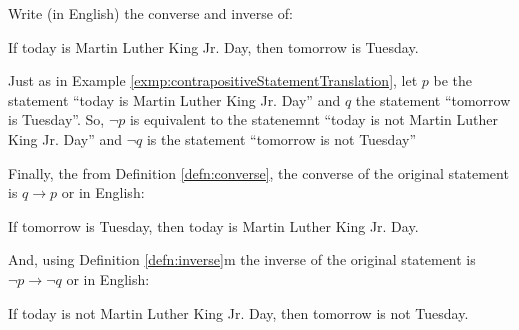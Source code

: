 \guard






\begin{exmp}
\label{exmp:converseInverseStatementTranslation}
  Write (in English) the converse and inverse of:
  \begin{center}
      If today is Martin Luther King Jr. Day, then tomorrow is Tuesday.
  \end{center}

  Just as in Example \ref{exmp:contrapositiveStatementTranslation}, let $p$ be the statement ``today is Martin Luther King Jr. Day'' and $q$ the statement ``tomorrow is Tuesday''.
  So, $\neg p$ is equivalent to the statenemnt ``today is not Martin Luther King Jr. Day'' and $\neg q$ is the statement ``tomorrow is not Tuesday''

  Finally, the from Definition \ref{defn:converse}, the converse of the original statement is $q \rightarrow p$ or in English:
  \begin{center}
      If tomorrow is Tuesday, then today is Martin Luther King Jr. Day.
  \end{center}
  And, using Definition \ref{defn:inverse}m the inverse of the original statement is $\neg p \rightarrow \neg q$ or in English:
  \begin{center}
      If today is not Martin Luther King Jr. Day, then tomorrow is not Tuesday.
  \end{center}
\end{exmp}
